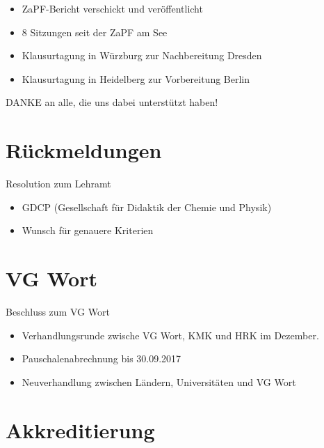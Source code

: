 \documentclass[compress, aspectratio=169]{beamer}
\begin{document}
\begin{frame}
  \begin{itemize}
    \item ZaPF-Bericht verschickt und veröffentlicht
    \item 8 Sitzungen seit der ZaPF am See
    \item Klausurtagung in Würzburg zur Nachbereitung Dresden
    \item Klausurtagung in Heidelberg zur Vorbereitung Berlin
    \end{itemize}
    \vspace{5mm}
    \begin{center}
      \Large DANKE an alle, die uns dabei unterstützt haben!
    \end{center}
\end{frame}

\section{Rückmeldungen}

\begin{frame}{Resolution zum Lehramt}
  \begin{itemize}
  \item GDCP (Gesellschaft für Didaktik der Chemie und Physik) 
  \item Wunsch für genauere Kriterien
  \end{itemize}
\end{frame}

\section{VG Wort}

\begin{frame}{Beschluss zum VG Wort}
  \begin{itemize}
  \item Verhandlungsrunde zwische VG Wort, KMK und HRK im Dezember.
  \item Pauschalenabrechnung bis 30.09.2017
  \item Neuverhandlung zwischen Ländern, Universitäten und VG Wort
  \end{itemize}
\end{frame}

\section{Akkreditierung}
\end{document}
